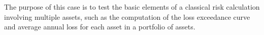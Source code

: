 The purpose of this case is to test the basic elements of a classical risk calculation involving multiple assets, such as the computation of the loss exceedance curve and average annual loss for each asset in a portfolio of assets.


